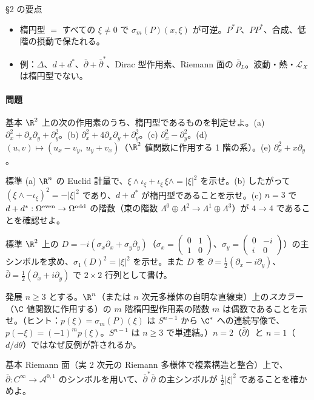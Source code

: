 \begin{keybox}{§2 の要点}
\begin{itemize}
\item 楕円型 $=$ すべての $\xi\ne0$ で $\sigma_m(P)(x,\xi)$ が可逆。$P^*P$、$PP^*$、合成、低階の摂動で保たれる。
\item 例：$\Delta$、$d+d^*$、$\bar\partial+\bar\partial^*$、Dirac 型作用素、Riemann 面の $\bar\partial_L$。波動・熱・$\mathcal L_X$ は楕円型でない。
\end{itemize}
\end{keybox}
\paragraph{問題}
\begin{prob}{基本}\label{p:elllist}
$\R^2$ 上の次の作用素のうち、楕円型であるものを判定せよ。(a) $\partial_x^2+\partial_x\partial_y+\partial_y^2$。(b) $\partial_x^2+4\partial_x\partial_y+\partial_y^2$。(c) $\partial_x^2-\partial_y^2$。(d) $(u,v)\mapsto(u_x-v_y,\ u_y+v_x)$（$\R^2$ 値関数に作用する 1 階の系）。(e) $\partial_x^2+x\partial_y$。
\end{prob}
\begin{prob}{標準}\label{p:sigmaDirac}
(a) $\R^n$ の Euclid 計量で、$\xi\wedge\iota_\xi+\iota_\xi\,\xi\wedge=|\xi|^2$ を示せ。(b) したがって $(\xi\wedge-\iota_\xi)^2=-|\xi|^2$ であり、$d+d^*$ が楕円型であることを示せ。(c) $n=3$ で $d+d^*:\Omega^{\rm even}\to\Omega^{\rm odd}$ の階数（束の階数 $\Lambda^0\oplus\Lambda^2\to\Lambda^1\oplus\Lambda^3$）が $4\to4$ であることを確認せよ。
\end{prob}
\begin{prob}{標準}\label{p:paulidirac}
$\R^2$ 上の $D=-i(\sigma_x\partial_x+\sigma_y\partial_y)$（$\sigma_x=\begin{pmatrix}0&1\\1&0\end{pmatrix}$、$\sigma_y=\begin{pmatrix}0&-i\\i&0\end{pmatrix}$）の主シンボルを求め、$\sigma_1(D)^2=|\xi|^2$ を示せ。また $D$ を $\partial=\frac12(\partial_x-i\partial_y)$、$\bar\partial=\frac12(\partial_x+i\partial_y)$ で $2\times2$ 行列として書け。
\end{prob}
\begin{prob}{発展}\label{p:scalarodd}
$n\ge3$ とする。$\R^n$（または $n$ 次元多様体の自明な直線束）上の\emph{スカラー}（$\C$ 値関数に作用する）の $m$ 階楕円型作用素の階数 $m$ は偶数であることを示せ。（ヒント：$p(\xi)=\sigma_m(P)(\xi)$ は $S^{n-1}$ から $\C^*$ への連続写像で、$p(-\xi)=(-1)^mp(\xi)$。$S^{n-1}$ は $n\ge3$ で単連結。）$n=2$（$\bar\partial$）と $n=1$（$d/d\theta$）ではなぜ反例が許されるか。
\end{prob}
\begin{prob}{基本}\label{p:dbarlap}
Riemann 面（実 2 次元の Riemann 多様体で複素構造と整合）上で、$\bar\partial:C^\infty\to\mathcal A^{0,1}$ のシンボルを用いて、$\bar\partial^*\bar\partial$ の主シンボルが $\frac12|\xi|^2$ であることを確かめよ。
\end{prob}

